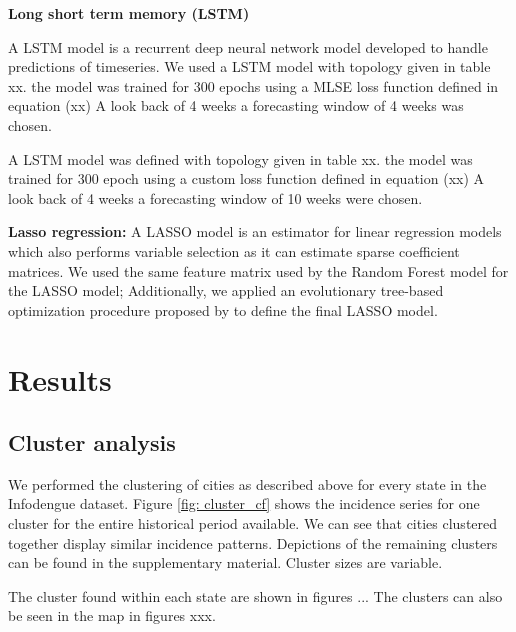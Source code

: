 \documentclass[12pt]{report}
\begin{document}
\begin{description}
 \item \textbf{Long short term memory (LSTM)}
 
 A LSTM model is a recurrent deep neural network model developed to handle predictions of timeseries. We used a LSTM model with topology given in table xx. the model was trained for 300 epochs using a MLSE loss function defined in equation (xx) A look back of 4 weeks a forecasting window of 4 weeks was chosen.

 
 A LSTM model was defined with topology given in table xx. the model was trained 
for 300 epoch using a custom loss function defined in equation (xx) A look back 
of 4 weeks a forecasting window of 10 weeks were chosen.


 
 \item \textbf{Lasso regression:}
  A LASSO model is an estimator for linear regression models which also performs variable selection as it can estimate sparse coefficient matrices. We used the same feature matrix used by the Random Forest model for the LASSO model; Additionally, we applied an evolutionary tree-based optimization procedure proposed by \citet{Olson_Bartley_Urbanowicz_Moore_2016} to define the final LASSO model.
 
\end{description}


\section{Results}

\subsection{Cluster analysis}

We performed the clustering of cities as described above for every state in the Infodengue dataset. Figure \ref{fig: cluster_cf} shows the incidence series for one cluster for the entire historical period available. We can see that cities clustered together display similar incidence patterns. Depictions of the remaining clusters can be found in the supplementary material. Cluster sizes are variable.


The cluster found within each state are shown in figures ... The clusters can 
also be seen in the map in figures xxx.
\end{document}
